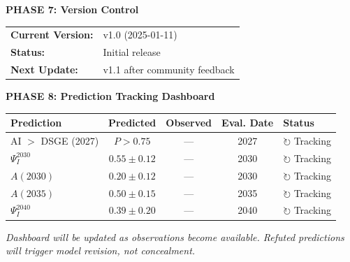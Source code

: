 \begin{tcolorbox}[colback=green!3!white, colframe=green!75!black,
    title=\textbf{EBF WORKFLOW: Applied to This Paper}]
\vspace{0.5em}
\textbf{PHASE 7: Version Control}

\begin{tabular}{@{}ll@{}}
\textbf{Current Version:} & v1.0 (2025-01-11) \\
\textbf{Status:} & Initial release \\
\textbf{Next Update:} & v1.1 after community feedback \\
\end{tabular}

\vspace{0.5em}
\textbf{PHASE 8: Prediction Tracking Dashboard}

\begin{center}
\small
\begin{tabular}{@{}lcccl@{}}
\toprule
\textbf{Prediction} & \textbf{Predicted} & \textbf{Observed} & \textbf{Eval. Date} & \textbf{Status} \\
\midrule
AI $>$ DSGE (2027) & $P > 0.75$ & --- & 2027 & $\circlearrowright$ Tracking \\
$\Psi_I^{2030}$ & $0.55 \pm 0.12$ & --- & 2030 & $\circlearrowright$ Tracking \\
$A(2030)$ & $0.20 \pm 0.12$ & --- & 2030 & $\circlearrowright$ Tracking \\
$A(2035)$ & $0.50 \pm 0.15$ & --- & 2035 & $\circlearrowright$ Tracking \\
$\Psi_I^{2040}$ & $0.39 \pm 0.20$ & --- & 2040 & $\circlearrowright$ Tracking \\
\bottomrule
\end{tabular}
\end{center}

\textit{Dashboard will be updated as observations become available. Refuted predictions
will trigger model revision, not concealment.}

\end{tcolorbox}

